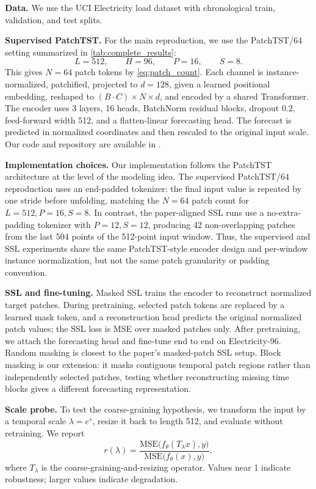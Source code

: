 \documentclass[11pt,twocolumn]{article}
\begin{document}
\textbf{Data.} We use the UCI Electricity \cite{electricity} load dataset with chronological train, validation, and test splits. 

\textbf{Supervised PatchTST.} For the main reproduction, we use the PatchTST/64 setting summarized in \autoref{tab:complete_results}:
\[
L=512,\qquad H=96,\qquad P=16,\qquad S=8.
\]
This gives $N=64$ patch tokens by \eqref{eq:patch_count}. Each channel is instance-normalized, patchified, projected to $d=128$, given a learned positional embedding, reshaped to $(B\cdot C)\times N\times d$, and encoded by a shared Transformer. The encoder uses 3 layers, 16 heads, BatchNorm residual blocks, dropout $0.2$, feed-forward width 512, and a flatten-linear forecasting head. The forecast is predicted in normalized coordinates and then rescaled to the original input scale. Our code and repository are available in \cite{Repo}.

\textbf{Implementation choices.} Our implementation follows the PatchTST architecture at the level of the modeling idea. The supervised PatchTST/64 reproduction uses an end-padded tokenizer: the final input value is repeated by one stride before unfolding, matching the $N=64$ patch count for $L=512,P=16,S=8$. In contrast, the paper-aligned SSL runs use a no-extra-padding tokenizer with $P=12,S=12$, producing 42 non-overlapping patches from the last 504 points of the 512-point input window. Thus, the supervised and SSL experiments share the same PatchTST-style encoder design and per-window instance normalization, but not the same patch granularity or padding convention.

\textbf{SSL and fine-tuning.} Masked SSL trains the encoder to reconstruct normalized target patches. During pretraining, selected patch tokens are replaced by a learned mask token, and a reconstruction head predicts the original normalized patch values; the SSL loss is MSE over masked patches only. After pretraining, we attach the forecasting head and fine-tune end to end on Electricity-96. Random masking is closest to the paper's masked-patch SSL setup. Block masking is our extension: it masks contiguous temporal patch regions rather than independently selected patches, testing whether reconstructing missing time blocks gives a different forecasting representation.

\textbf{Scale probe.} To test the coarse-graining hypothesis, we transform the input by a temporal scale $\lambda=e^s$, resize it back to length 512, and evaluate without retraining. We report
\begin{equation}
\label{eq:scale_ratio}
r(\lambda)=
\frac{\mathrm{MSE}\bigl(f_\theta(T_\lambda x),y\bigr)}
{\mathrm{MSE}\bigl(f_\theta(x),y\bigr)},
\end{equation}
where $T_\lambda$ is the coarse-graining-and-resizing operator. Values near 1 indicate robustness; larger values indicate degradation.
\end{document}
